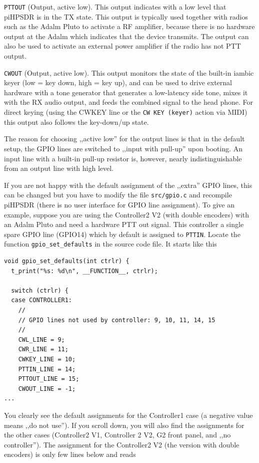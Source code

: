 \documentclass[12pt]{book}
\def\rett#1{\texttt{\color{red}#1}}
\def\bltt#1{\texttt{\color{blue}#1}}
\def\pH{pi\-HPSDR }
\begin{document}
\rett{PTTOUT} (Output, active low). This output indicates with a low level that \pH is in the
TX state. This output is typically used together with radios such as the Adalm Pluto to activate
a RF amplifier, because there is no hardware output at the Adalm which indicates that the device
transmits. The output can also be used to activate an external power amplifier if the radio has
not PTT output.

\rett{CWOUT} (Output, active low). This output monitors the state of the built-in iambic keyer
(low = key down, high = key up), and can be used to drive external hardware with a tone generator
that generates a low-latency side tone, mixes it with the RX audio output, and feeds the combined
signal to the head phone. For direct keying (using the CWKEY line or the \bltt{CW KEY (keyer)}
action via MIDI) this output also
follows the key-down/up state.

The reason for choosing ,,active low'' for the output lines is that in the default setup,
the GPIO lines are switched
to ,,input with pull-up'' upon booting. An input line with a built-in pull-up
resistor is, however,
nearly indistinguishable from an output line with high level.

If you are not happy with the default assignment of the ,,extra'' GPIO lines, this can be changed
but you have to modify the file \texttt{src/gpio.c} and recompile \pH (there is no user interface
for GPIO line assignment). To give an example, suppose you are using the Controller2 V2 (with double
encoders) with an Adalm Pluto and need a hardware PTT out signal. This controller a single spare GPIO line
(GPIO14) which by default is assigned to \rett{PTTIN}. Locate the function \texttt{gpio\_set\_defaults}
in the source code file. It starts like this

\begin{small}
\begin{verbatim}
void gpio_set_defaults(int ctrlr) {
  t_print("%s: %d\n", __FUNCTION__, ctrlr);

  switch (ctrlr) {
  case CONTROLLER1:
    //
    // GPIO lines not used by controller: 9, 10, 11, 14, 15
    //
    CWL_LINE = 9;
    CWR_LINE = 11;
    CWKEY_LINE = 10;
    PTTIN_LINE = 14;
    PTTOUT_LINE = 15;
    CWOUT_LINE = -1;
...
\end{verbatim}
\end{small}

You clearly see the default assignments for the Controller1 case (a negative value means ,,do not use'').
If you scroll down, you will also find the assignments for the other cases (Controller2 V1, Controller 2 V2,
G2 front panel, and ,,no controller''). The assignment for the Controller2 V2 (the version with double
encoders) is only few lines below and reads
\end{document}
